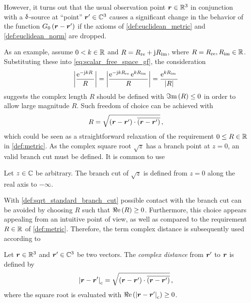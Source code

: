 However, it turns out that the usual observation point $\robs \in \R^3$ 
in conjunction with a $\operatorname{\updelta}$-source at \enquote{point} $\rsrc \in \C^3$
causes a significant change in the behavior of the function
$G_0 \left(\rdiff\right)$ if the axioms of \cref{def:euclidean_metric} and
\cref{def:euclidean_norm} are dropped.

As an example, assume $0 < k \in \mathbb{R}$ and
$R = R_\mathrm{re} + \mathrm{j} R_\mathrm{im}$, where
$R = R_\mathrm{re}, R_\mathrm{im} \in \mathbb{R}$.
Substituting these into \eqref{eq:scalar_free_space_gf}, the consideration
\begin{equation}\label{eq:example_csb}
	\left\vert\frac{\mathrm{e}^{-\mathrm{j} k R}\,}{R}\right\vert = 
	\left\vert \frac{\mathrm{e}^{-\mathrm{j} k R_\mathrm{re}}\, \mathrm{e}^{k R_\mathrm{im}}\,}{R} \right\vert = 
	\frac{\mathrm{e}^{k R_\mathrm{im}}\,}{\left\vert R\right\vert}
\end{equation}
suggests the complex length $R$ should be defined with $\Im\mathrm{m}\left(R\right) \leq 0$ in
order to allow large magnitude $R$. Such freedom of choice can be achieved
with
\begin{equation}
	R = \sqrt{\left(\rdiff\right) \cdot \overline{\left(\rdiff\right)}}
	\, ,
\end{equation}
which could be seen as a straightforward relaxation of the requirement
$0 \leq R \in \mathbb{R}$ in \cref{def:metric}.
As the complex square root $\sqrt{z}$ has a branch point at $z = 0$, an
valid branch cut must be defined.
It is common to use
\begin{definition}
	\label{def:sqrt_standard_branch_cut}
	Let $z \in \mathbb{C}$ be arbitrary.
	The branch cut of $\sqrt{z}$ is defined from $z = 0$ along the real axis
	to $-\infty$.
\end{definition}

With \cref{def:sqrt_standard_branch_cut} possible contact with the branch cut
can be avoided by choosing $R$ such that $\Re\mathrm{e}\left(R\right) \geq 0$.
Furthermore, this choice appears appealing from an intuitive point of view,
as well as compared to the requirement $R \in \mathbb{R}$ of \cref{def:metric}.
Therefore, the term complex distance is subsequently used according to
\begin{definition}\label{def:cmplx_distance}
	Let $\robs \in \R^3$ and $\rsrc \in \C^3$ be two vectors.
	The \emph{complex distance} from $\rsrc$ to $\robs$ is defined by
	\begin{equation}
		\cmplxlength{\rdiff} = 
		\sqrt{\left(\rdiff\right) \cdot \overline{\left(\rdiff\right)}}
		\, ,
	\end{equation}
	where the square root is evaluated with
	$\real{\cmplxlength{\rdiff}} \geq 0$.
\end{definition}

